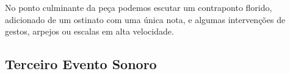 No ponto culminante da peça podemos escutar um contraponto florido, adicionado de um ostinato com uma única nota, e algumas intervenções de gestos, arpejos ou escalas em alta velocidade.

\subsection{Terceiro Evento Sonoro}\label{sec:terceiro evento}